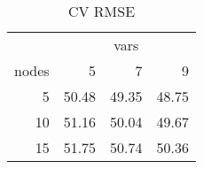 \begin{table}

\caption{\label{tab:rf_results}CV RMSE}
\centering
\begin{tabular}[t]{r|r|r|r}
\hline
\multicolumn{1}{c|}{ } & \multicolumn{3}{c}{vars} \\
\cline{2-4}
nodes & 5 & 7 & 9\\
\hline
5 & 50.48 & 49.35 & 48.75\\
\hline
10 & 51.16 & 50.04 & 49.67\\
\hline
15 & 51.75 & 50.74 & 50.36\\
\hline
\end{tabular}
\end{table}